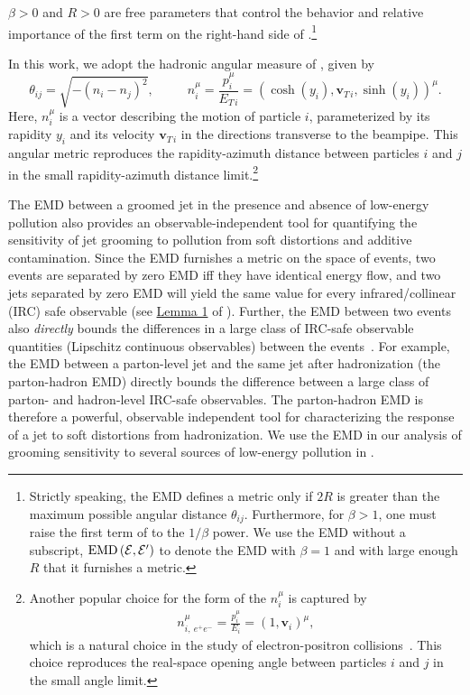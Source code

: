 \documentclass[letterpaper,11pt]{article}
\begin{document}
%
\(\beta > 0\) and \(R > 0\) are free parameters that control the behavior and relative importance of the first term on the right-hand side of .\footnote{
Strictly speaking, the EMD defines a metric only if \(2 R\) is greater than the maximum possible angular distance \(\theta_{ij}\).
%
Furthermore, for \(\beta > 1\), one must raise the first term of  to the \(1/\beta\) power.
%
We use the EMD without a subscript, \(
{\rm EMD}\left(\mathcal{E}, \mathcal{E}'\right)
\) to denote the EMD with \(\beta = 1\) and with large enough \(R\) that it furnishes a metric.
}


In this work, we adopt the hadronic angular measure of , given by
\begin{equation}
    \theta_{ij} = \sqrt{-(n_i - n_j)^2}
    ,
    ~~~~~~
    ~~~~~~
    n_{i}^\mu = \frac{p_i^\mu}{E_{T\,i}} = (\cosh(y_i), \textbf{v}_{T\,i}, \sinh(y_i))^\mu
    .
    \label{eqn:hadronic_metric}
\end{equation}
Here, \(n_i^\mu\) is a vector describing the motion of particle \(i\), parameterized by its rapidity \(y_i\) and its velocity \(\textbf{v}_{T\, i}\) in the directions transverse to the beampipe.
%
This angular metric reproduces the rapidity-azimuth distance between particles \(i\) and \(j\) in the small rapidity-azimuth distance limit.\footnote{
Another popular choice for the form of the \(n_i^\mu\) is captured by
\begin{align}
    \label{eqn:ee_metric}
    n_{i,~{e^+e^-}}^\mu = \frac{p_i^\mu}{E_i} = (1, \textbf{v}_i)^\mu
    ,
\end{align}
which is a natural choice in the study of electron-positron collisions~\cite{Komiske:2020qhg}.
%
This choice reproduces the real-space opening angle between particles \(i\) and \(j\) in the small angle limit.
}

The EMD between a groomed jet in the presence and absence of low-energy pollution also provides an observable-independent tool for quantifying the sensitivity of jet grooming to pollution from soft distortions and additive contamination.
%
Since the EMD furnishes a metric on the space of events, two events are separated by zero EMD iff they have identical energy flow, and two jets separated by zero EMD will yield the same value for every infrared/collinear (IRC) safe observable (see \href{https://arxiv.org/pdf/2004.04159.pdf#page=11\&zoom=100,0,650}{Lemma 1} of ).
%
Further, the EMD between two events also \textit{directly} bounds the differences in a large class of IRC-safe observable quantities (Lipschitz continuous observables) between the events~\cite{Komiske:2019fks}.
%
For example, the EMD between a parton-level jet and the same jet after hadronization (the parton-hadron EMD) directly bounds the difference between a large class of parton- and hadron-level IRC-safe observables.
%
The parton-hadron EMD is therefore a powerful, observable independent tool for characterizing the response of a jet to soft distortions from hadronization.
%
We use the EMD in our analysis of grooming sensitivity to several sources of low-energy pollution in .
\end{document}
